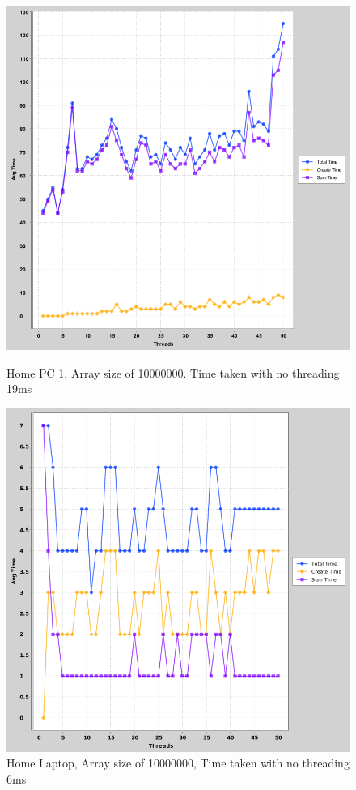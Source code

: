 \documentclass[a4paper, 12pt]{article}
\begin{document}
		\begin{figure}[H]
  \includegraphics[width=\linewidth]{threads-vs-time-10000000-anna.png}
  \caption{Home PC 1, Array size of 10000000. Time taken with no threading 19ms}
\endminipage\hfill
{}
  \includegraphics[width=\linewidth]{threads-vs-time-10000000-laptop.png}
  \caption{Home Laptop, Array size of 10000000, Time taken with no threading 6ms}
\endminipage\hfill
		\end{figure}
		
\end{document}
